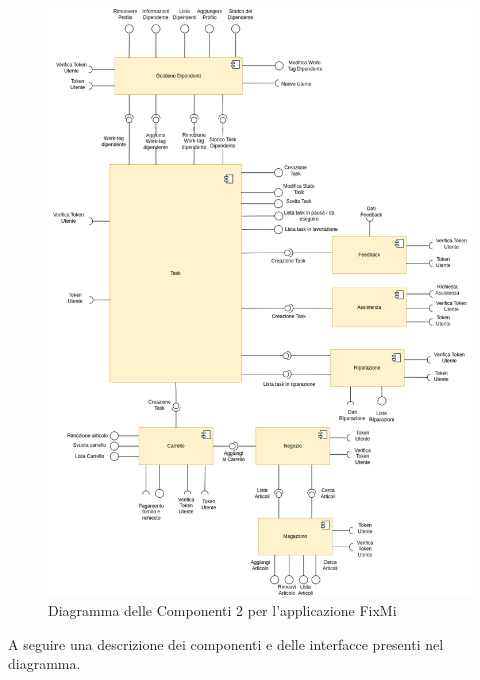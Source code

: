 \documentclass{report}
\begin{document}
\begin{figure}[H]
	\centering\includegraphics[width=1\textwidth]{images/diagramma_dei_componenti.png}
	Diagramma delle Componenti 2 per l'applicazione FixMi
\end{figure}
A seguire una descrizione dei componenti e delle interfacce presenti nel diagramma.
\end{document}
